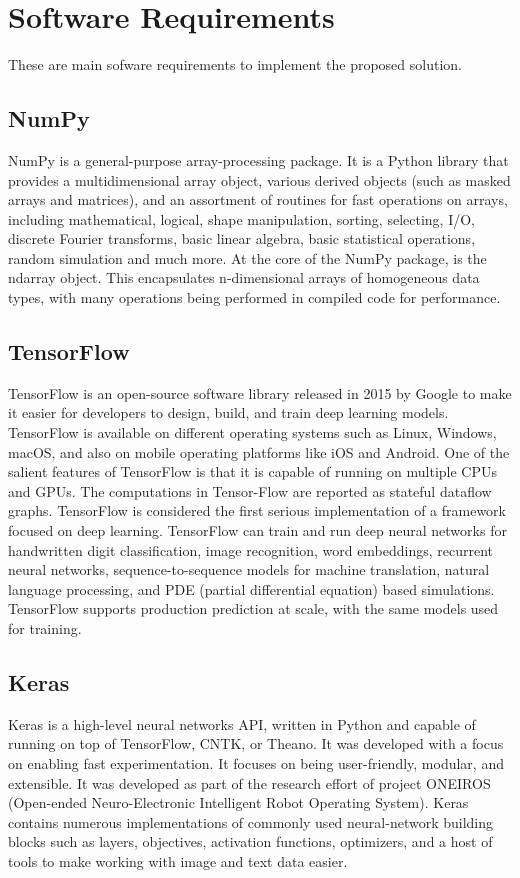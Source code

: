 \section{Software Requirements}
These are main sofware requirements to implement the proposed solution.

\subsection{NumPy}
NumPy is a general-purpose array-processing package.  It is a Python library that provides a multidimensional array object, various derived objects (such as masked arrays and matrices), and an assortment of routines for fast operations on arrays, including mathematical, logical, shape manipulation, sorting, selecting, I/O, discrete Fourier transforms, basic linear algebra, basic statistical operations, random simulation and much more.  At the core of the NumPy package, is the ndarray object.  This encapsulates n-dimensional arrays of homogeneous data types, with many operations being performed in compiled code for performance.

\subsection{TensorFlow}
TensorFlow is an open-source software library released in 2015 by Google to make it easier for developers to design, build, and train deep learning models. TensorFlow is available on different operating systems such as Linux, Windows, macOS, and also on mobile operating platforms like iOS and Android.  One of the salient features of TensorFlow is that it is capable of running on multiple CPUs and GPUs.  The computations in Tensor-Flow are reported as stateful dataflow graphs. TensorFlow is considered the first serious implementation of a framework focused on deep learning. TensorFlow can train and run deep neural networks for handwritten digit classification, image recognition, word embeddings, recurrent neural networks, sequence-to-sequence models for machine translation, natural language processing, and PDE (partial differential equation) based simulations. TensorFlow supports production prediction at scale, with the same models used for training.

\subsection{Keras}
Keras is a high-level neural networks API, written in Python and capable of running on top of TensorFlow, CNTK, or Theano. It was developed with a focus on enabling fast experimentation. It focuses on being user-friendly, modular, and extensible. It was developed as part of the research effort of project ONEIROS (Open-ended Neuro-Electronic Intelligent Robot Operating System). Keras contains numerous implementations of commonly used neural-network building blocks such as layers, objectives, activation functions, optimizers, and a host of tools to make working with image and text data easier.

